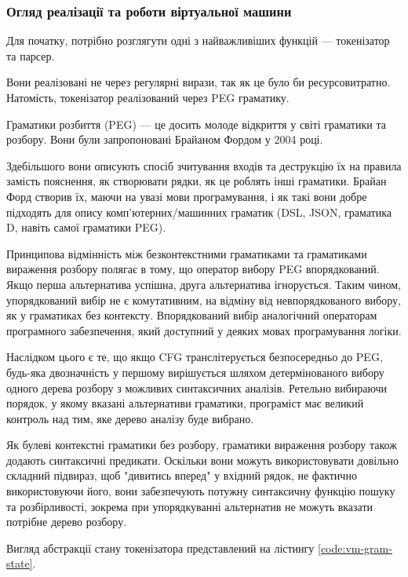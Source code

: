 \documentclass{lib/styles/default-style}
\begin{document}
    \subsubsection{Огляд реалізації та роботи віртуальної машини}

    Для початку, потрібно розглягути одні з найважливіших функцій --- токенізатор та парсер.

    Вони реалізовані не через регулярні вирази, так як це було би ресурсовитратно.
    Натомість, токенізатор реалізований через PEG граматику.

    Граматики розбиття (PEG) --- це досить молоде відкриття у світі граматики та розбору.
    Вони були запропоновані Брайаном Фордом у 2004 році.

    Здебільшого вони описують спосіб зчитування входів та
    деструкцію їх на правила замість пояснення,
    як створювати рядки, як це роблять інші граматики.
    Брайан Форд створив їх, маючи на увазі мови програмування,
    і як такі вони добре підходять для опису комп'ютерних/машинних граматик (DSL, JSON, граматика D, навіть самої граматики PEG).

    Принципова відмінність між безконтекстними граматиками та граматиками вираження розбору
    полягає в тому, що оператор вибору PEG впорядкований.
    Якщо перша альтернатива успішна, друга альтернатива ігнорується.
    Таким чином, упорядкований вибір не є комутативним,
    на відміну від невпорядкованого вибору, як у граматиках без контексту.
    Впорядкований вибір аналогічний операторам програмного забезпечення, який доступний у деяких мовах програмування логіки.

    Наслідком цього є те, що якщо CFG транслітерується безпосередньо до
    PEG, будь-яка двозначність у першому вирішується шляхом детермінованого вибору одного
    дерева розбору з можливих синтаксичних аналізів.
    Ретельно вибираючи порядок, у якому вказані альтернативи
    граматики, програміст має великий контроль над тим, яке дерево аналізу буде вибрано.

    Як булеві контекстні граматики без розбору, граматики вираження розбору
    також додають синтаксичні предикати. Оскільки вони можуть використовувати довільно складний підвираз,
    щоб "дивитись вперед" у вхідний рядок, не фактично використовуючи його,
    вони забезпечують потужну синтаксичну функцію пошуку та розбірливості,
    зокрема при упорядкуванні альтернатив не можуть вказати потрібне дерево розбору.

    Вигляд абстракції стану токенізатора представлений на лістингу \ref{code:vm-gram-state}.
\end{document}
